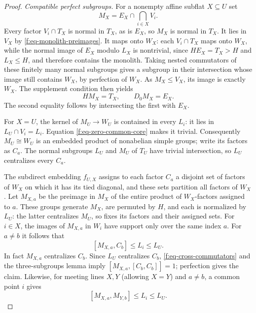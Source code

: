 \begin{proof}
\emph{Compatible perfect subgroups.}
For a nonempty affine subflat $X\subseteq U$ set
\begin{equation}\label{f:eq-mx}
 M_X=E_X\cap\bigcap_{i\in X}V_i.
\end{equation}
Every factor $V_i\cap T_X$ is normal in $T_X$, as is $E_X$, so $M_X$ is
normal in $T_X$. It lies in $V_X$ by
\eqref{f:eq-monolith-preimages}. It maps onto $W_X$: each
$V_i\cap T_X$ maps onto $W_X$, while the normal image of $E_X$ modulo $L_X$
is nontrivial, since $HE_X=T_X>H$ and $L_X\le H$, and therefore contains
the monolith. Taking nested commutators of these finitely many normal
subgroups gives a subgroup in their intersection whose image still
contains $W_X$, by perfection of $W_X$. As $M_X\le V_X$, its image is exactly
$W_X$. The supplement condition then yields
\begin{equation}\label{f:eq-domain-mx}
 HM_X=T_X,\qquad D_0M_X=E_X.
\end{equation}
The second equality follows by intersecting the first with $E_X$.

For $X=U$, the kernel of $M_U\to W_U$ is contained in every $L_i$: it lies
in $L_U\cap V_i=L_i$. Equation \eqref{f:eq-zero-common-core} makes it trivial.
Consequently $M_U\cong W_U$ is an embedded product of nonabelian simple
groups; write its factors as $C_a$. The normal subgroups $L_U$ and $M_U$
of $T_U$ have trivial intersection, so $L_U$ centralizes every $C_a$.

The subdirect embedding $f_{U,X}$ assigns to each factor $C_a$ a disjoint
set of factors of $W_X$ on which it has its tied diagonal, and these sets
partition all factors of $W_X$. Let $M_{X,a}$ be the preimage in $M_X$ of
the entire product of $W_X$-factors assigned to $a$. These groups generate
$M_X$, are permuted by $H$, and each is normalized by $L_U$: the latter
centralizes $M_U$, so fixes its factors and their assigned sets.
For $i\in X$, the images of $M_{X,a}$ in $W_i$ have support only over the
same index $a$. For $a\ne b$ it follows that
\begin{equation}\label{f:eq-cross-commutators}
 [M_{X,a},C_b]\le L_i\le L_U.
\end{equation}
In fact $M_{X,a}$ centralizes $C_b$. Since $L_U$ centralizes $C_b$,
\eqref{f:eq-cross-commutators} and the three-subgroups lemma imply
$[M_{X,a},[C_b,C_b]]=1$; perfection gives the claim. Likewise, for meeting
lines $X,Y$ (allowing $X=Y$) and $a\ne b$, a common point $i$ gives
\begin{equation}\label{f:eq-line-commutators}
 [M_{X,a},M_{Y,b}]\le L_i\le L_U.
\end{equation}


\end{proof}
